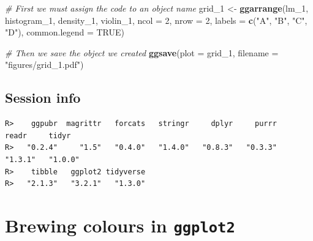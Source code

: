 \documentclass[
]{book}
\newenvironment{Shaded}{\begin{snugshade}}{\end{snugshade}}
\newcommand{\CommentTok}[1]{\textcolor[rgb]{0.56,0.35,0.01}{\textit{#1}}}
\newcommand{\DataTypeTok}[1]{\textcolor[rgb]{0.13,0.29,0.53}{#1}}
\newcommand{\DecValTok}[1]{\textcolor[rgb]{0.00,0.00,0.81}{#1}}
\newcommand{\KeywordTok}[1]{\textcolor[rgb]{0.13,0.29,0.53}{\textbf{#1}}}
\newcommand{\NormalTok}[1]{#1}
\newcommand{\OperatorTok}[1]{\textcolor[rgb]{0.81,0.36,0.00}{\textbf{#1}}}
\newcommand{\OtherTok}[1]{\textcolor[rgb]{0.56,0.35,0.01}{#1}}
\newcommand{\StringTok}[1]{\textcolor[rgb]{0.31,0.60,0.02}{#1}}
\begin{document}
\begin{Shaded}
\begin{Highlighting}[]
\CommentTok{\# First we must assign the code to an object name}
\NormalTok{grid\_}\DecValTok{1}\NormalTok{ <{-}}\StringTok{ }\KeywordTok{ggarrange}\NormalTok{(lm\_}\DecValTok{1}\NormalTok{, histogram\_}\DecValTok{1}\NormalTok{, density\_}\DecValTok{1}\NormalTok{, violin\_}\DecValTok{1}\NormalTok{, }
                    \DataTypeTok{ncol =} \DecValTok{2}\NormalTok{, }\DataTypeTok{nrow =} \DecValTok{2}\NormalTok{, }
                    \DataTypeTok{labels =} \KeywordTok{c}\NormalTok{(}\StringTok{"A"}\NormalTok{, }\StringTok{"B"}\NormalTok{, }\StringTok{"C"}\NormalTok{, }\StringTok{"D"}\NormalTok{),}
                    \DataTypeTok{common.legend =} \OtherTok{TRUE}\NormalTok{)}

\CommentTok{\# Then we save the object we created}
\KeywordTok{ggsave}\NormalTok{(}\DataTypeTok{plot =}\NormalTok{ grid\_}\DecValTok{1}\NormalTok{, }\DataTypeTok{filename =} \StringTok{"figures/grid\_1.pdf"}\NormalTok{)}
\end{Highlighting}
\end{Shaded}

\hypertarget{session-info-4}{%
\section{Session info}\label{session-info-4}}

\begin{Shaded}
\end{Shaded}

\begin{verbatim}
R>    ggpubr  magrittr   forcats   stringr     dplyr     purrr     readr     tidyr 
R>   "0.2.4"     "1.5"   "0.4.0"   "1.4.0"   "0.8.3"   "0.3.3"   "1.3.1"   "1.0.0" 
R>    tibble   ggplot2 tidyverse 
R>   "2.1.3"   "3.2.1"   "1.3.0"
\end{verbatim}

\hypertarget{brewing}{%
\chapter{\texorpdfstring{Brewing colours in \textbf{\texttt{ggplot2}}}{Brewing colours in ggplot2}}\label{brewing}}
\end{document}
